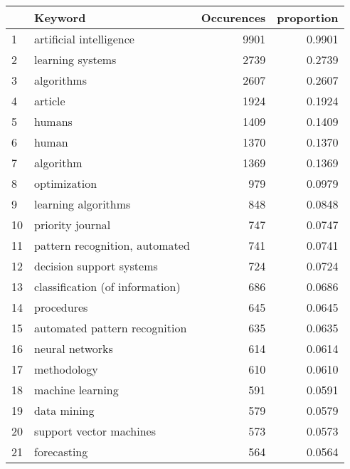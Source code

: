 \begin{tabular}{llrr}
\toprule
{} &                                  Keyword &  Occurences &  proportion \\
\midrule
1  &                  artificial intelligence &        9901 &      0.9901 \\
2  &                         learning systems &        2739 &      0.2739 \\
3  &                               algorithms &        2607 &      0.2607 \\
4  &                                  article &        1924 &      0.1924 \\
5  &                                   humans &        1409 &      0.1409 \\
6  &                                    human &        1370 &      0.1370 \\
7  &                                algorithm &        1369 &      0.1369 \\
8  &                             optimization &         979 &      0.0979 \\
9  &                      learning algorithms &         848 &      0.0848 \\
10 &                         priority journal &         747 &      0.0747 \\
11 &           pattern recognition, automated &         741 &      0.0741 \\
12 &                 decision support systems &         724 &      0.0724 \\
13 &          classification (of information) &         686 &      0.0686 \\
14 &                               procedures &         645 &      0.0645 \\
15 &            automated pattern recognition &         635 &      0.0635 \\
16 &                          neural networks &         614 &      0.0614 \\
17 &                              methodology &         610 &      0.0610 \\
18 &                         machine learning &         591 &      0.0591 \\
19 &                              data mining &         579 &      0.0579 \\
20 &                  support vector machines &         573 &      0.0573 \\
21 &                              forecasting &         564 &      0.0564 \\

\end{tabular}
